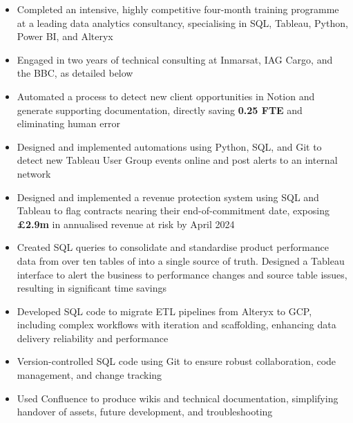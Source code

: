\begin{paracol}{2}

\begin{itemize}
\item Completed an intensive, highly competitive four-month training programme at a leading data analytics consultancy, specialising in SQL, Tableau, Python, Power BI, and Alteryx
\item Engaged in two years of technical consulting at Inmarsat, IAG Cargo, and the BBC, as detailed below
\item Automated a process to detect new client opportunities in Notion and generate supporting documentation, directly saving \textbf{0.25 FTE} and eliminating human error
\item Designed and implemented automations using Python, SQL, and Git to detect new Tableau User Group events online and post alerts to an internal network

\medskip
{}

\end{itemize}

\divider

\begin{itemize}
\item Designed and implemented a revenue protection system using SQL and Tableau to flag contracts nearing their end-of-commitment date, exposing \textbf{£2.9m} in annualised revenue at risk by April 2024
\item Created SQL queries to consolidate and standardise product performance data from over ten tables of into a single source of truth. Designed a Tableau interface to alert the business to performance changes and source table issues, resulting in significant time savings
\item Developed SQL code to migrate ETL pipelines from Alteryx to GCP, including complex workflows with iteration and scaffolding, enhancing data delivery reliability and performance
\item Version-controlled SQL code using Git to ensure robust collaboration, code management, and change tracking
\item Used Confluence to produce wikis and technical documentation, simplifying handover of assets, future development, and troubleshooting


\end{itemize}
\end{paracol}
